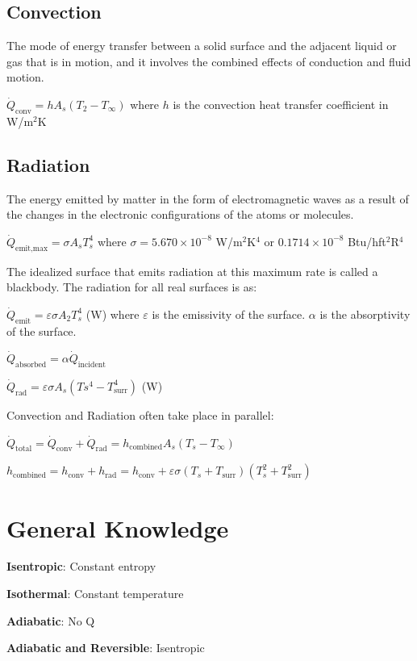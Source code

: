 \documentclass{article}
\begin{document}
\begin{multicols}{3}
    \subsection*{Convection}
    The mode of energy transfer between a solid surface and the adjacent liquid or gas that is in motion, and it involves the combined effects of conduction and fluid motion.\par 
    $\dot{Q}_\text{conv}=hA_s(T_2-T_\infty)$ where $h$ is the convection heat transfer coefficient in W/m$^2$K
    \subsection*{Radiation}
    The energy emitted by matter in the form of electromagnetic waves as a result of the changes in the electronic configurations of the atoms or molecules.\par 
    $\dot{Q}_\text{emit,max}=\sigma A_sT_s^4$ where $\sigma = 5.670\times 10^{-8}$ W/m$^2$K$^4$ or $0.1714\times 10^{-8}$ Btu/hft$^2$R$^4$\par 
    The idealized surface that emits radiation at this maximum rate is called a blackbody. The radiation for all real surfaces is as:\par 
    $\dot{Q}_\text{emit}=\varepsilon\sigma A_2T_s^4$ (W) where $\varepsilon$ is the emissivity of the surface. $\alpha$ is the absorptivity of the surface.\par 
    $\dot{Q}_\text{absorbed}=\alpha\dot{Q}_\text{incident}$\par 
    $\dot{Q}_\text{rad}=\varepsilon\sigma A_s(Ts^4-T_\text{surr}^4)$ (W)\par 
    Convection and Radiation often take place in parallel:\par 
    $\dot{Q}_\text{total}=\dot{Q}_\text{conv}+\dot{Q}_\text{rad}=h_\text{combined}A_s(T_s-T_\infty)$\par 
    $h_\text{combined}=h_\text{conv}+h_\text{rad}=h_\text{conv}+\varepsilon\sigma(T_s+T_\text{surr})(T_s^2+T_\text{surr}^2)$

    \section*{General Knowledge}
    \textbf{Isentropic}: Constant entropy\par 
    \textbf{Isothermal}: Constant temperature\par 
    \textbf{Adiabatic}: No Q\par 
    \textbf{Adiabatic and Reversible}: Isentropic\par


\end{multicols}  
\end{document}

